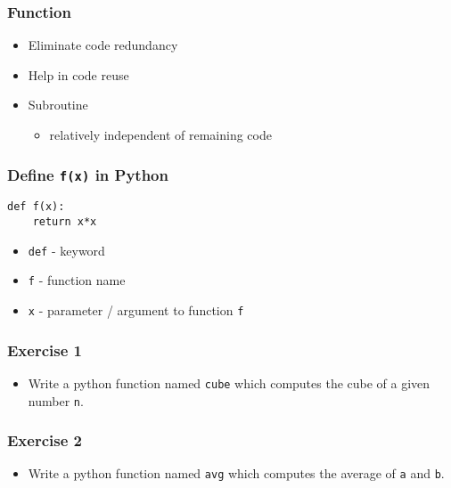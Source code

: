 \documentclass[17pt,compress]{beamer}
\begin{document}
\begin{frame}
\frametitle{Function}
\label{sec-4}
\begin{itemize}
\item Eliminate code redundancy\pause
\item Help in code reuse\pause
\item Subroutine
	\begin{itemize}
	\item relatively independent of remaining code
	\end{itemize}
\end{itemize}
\end{frame}
\begin{frame}[fragile]
\frametitle{Define \texttt{f(x)} in Python}
\label{sec-5}

\lstset{language=Python}
\begin{lstlisting}
def f(x):
    return x*x
\end{lstlisting}

\begin{itemize}\pause
\item \texttt{def} - keyword\pause
\item \texttt{f} - function name\pause
\item \texttt{x} - parameter / argument to function \texttt{f}
\end{itemize}
\end{frame}
\begin{frame}
\frametitle{Exercise 1}
\label{sec-6}

\begin{itemize}
\item Write a python function named \texttt{cube} which computes the cube of a given
  number \texttt{n}.
\end{itemize}
\end{frame}
\begin{frame}
\frametitle{Exercise 2}
\label{sec-7}

\begin{itemize}
\item Write a python function named \texttt{avg} which computes the average of
  \texttt{a} and \texttt{b}.
\end{itemize}
\end{frame}
\end{document}
